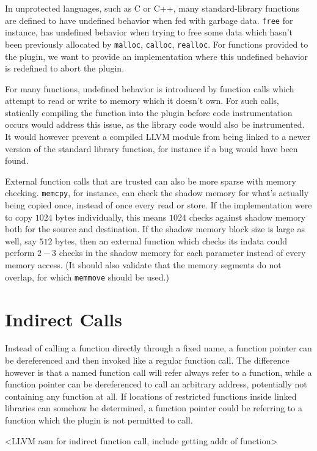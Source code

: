 In unprotected languages, such as C or C++, many standard-library functions are
defined to have undefined behavior when fed with garbage data. \texttt{free} for
instance, has undefined behavior when trying to free some data which hasn't been
previously allocated by \texttt{malloc}, \texttt{calloc}, \texttt{realloc}. For
functions provided to the plugin, we want to provide an implementation where
this undefined behavior is redefined to abort the plugin.

For many functions, undefined behavior is introduced by function calls which
attempt to read or write to memory which it doesn't own. For such calls, 
statically compiling the function into the plugin before code instrumentation
occurs would address this issue, as the library code would also be instrumented.
It would however prevent a compiled LLVM module from being linked to a newer
version of the standard library function, for instance if a bug would have been
found.

External function calls that are trusted can also be more sparse with memory
checking. \texttt{memcpy}, for instance, can check the shadow memory for what's
actually being copied once, instead of once every read or store. If the
implementation were to copy $1024$ bytes individually, this means $1024$ checks
against shadow memory both for the source and destination. If the shadow memory
block size is large as well, say $512$ bytes, then an external function which
checks its indata could perform $2-3$ checks in the shadow memory for each
parameter instead of every memory access. (It should also validate that the
memory segments do not overlap, for which \texttt{memmove} should be used.)


\section {Indirect Calls}

Instead of calling a function directly through a fixed name, a function pointer
can be dereferenced and then invoked like a regular function call. The
difference however is that a named function call will refer always refer to a
function, while a function pointer can be dereferenced to call an arbitrary
address, potentially not containing any function at all. If locations of
restricted functions inside linked libraries can somehow be determined, a
function pointer could be referring to a function which the plugin is not
permitted to call.

<LLVM asm for indirect function call, include getting addr of function>

